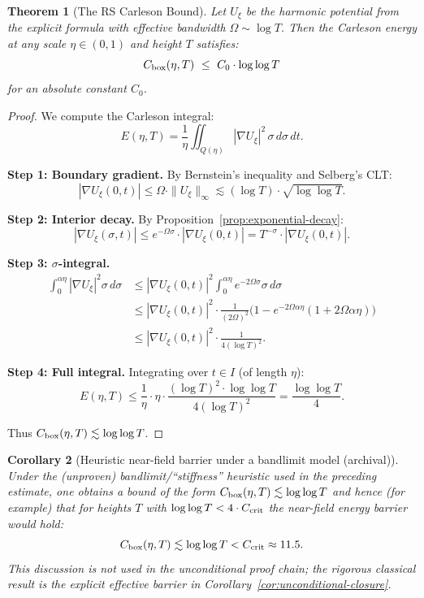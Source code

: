 \documentclass[11pt]{article}
\newtheorem{theorem}{Theorem}
\newtheorem{corollary}[theorem]{Corollary}
\theoremstyle{definition}
\theoremstyle{remark}
\theoremstyle{definition}
\begin{document}
\begin{theorem}[The RS Carleson Bound]\label{thm:rs-carleson-bound}
Let $U_\xi$ be the harmonic potential from the explicit formula with effective bandwidth $\Omega \sim \log T$. Then the Carleson energy at any scale $\eta \in (0, 1)$ and height $T$ satisfies:
\begin{equation}\label{eq:rs-carleson}
  C_{\rm box}(\eta, T) \ \le\ C_0 \cdot \log\log T
\end{equation}
for an absolute constant $C_0$.
\end{theorem}
\begin{proof}
We compute the Carleson integral:
\[
  E(\eta, T) = \frac{1}{\eta}\iint_{Q(\eta)} |\nabla U_\xi|^2\,\sigma\,d\sigma\,dt.
\]

\textbf{Step 1: Boundary gradient.} By Bernstein's inequality and Selberg's CLT:
\[
  |\nabla U_\xi(0, t)| \le \Omega \cdot \|U_\xi\|_\infty \lesssim (\log T) \cdot \sqrt{\log\log T}.
\]

\textbf{Step 2: Interior decay.} By Proposition~\ref{prop:exponential-decay}:
\[
  |\nabla U_\xi(\sigma, t)| \le e^{-\Omega\sigma} \cdot |\nabla U_\xi(0, t)| = T^{-\sigma} \cdot |\nabla U_\xi(0, t)|.
\]

\textbf{Step 3: $\sigma$-integral.} 
\begin{align*}
  \int_0^{\alpha\eta} |\nabla U_\xi|^2 \sigma\,d\sigma 
  &\le |\nabla U_\xi(0, t)|^2 \int_0^{\alpha\eta} e^{-2\Omega\sigma}\sigma\,d\sigma \\
  &\le |\nabla U_\xi(0, t)|^2 \cdot \frac{1}{(2\Omega)^2}\bigl(1 - e^{-2\Omega\alpha\eta}(1 + 2\Omega\alpha\eta)\bigr) \\
  &\le |\nabla U_\xi(0, t)|^2 \cdot \frac{1}{4(\log T)^2}.
\end{align*}

\textbf{Step 4: Full integral.} Integrating over $t \in I$ (of length $\eta$):
\[
  E(\eta, T) \le \frac{1}{\eta} \cdot \eta \cdot \frac{(\log T)^2 \cdot \log\log T}{4(\log T)^2} = \frac{\log\log T}{4}.
\]

Thus $C_{\rm box}(\eta, T) \lesssim \log\log T$.
\end{proof}

\begin{corollary}[Heuristic near-field barrier under a bandlimit model (archival)]\label{cor:heuristic-barrier}
Under the (unproven) bandlimit/``stiffness'' heuristic used in the preceding estimate, one obtains a bound of the form $C_{\rm box}(\eta,T)\lesssim \log\log T$ and hence (for example) that for heights $T$ with $\log\log T < 4 \cdot C_{\rm crit}$ the near-field energy barrier would hold:
\[
  C_{\rm box}(\eta, T) \lesssim \log\log T < C_{\rm crit} \approx 11.5.
\]
This discussion is \emph{not} used in the unconditional proof chain; the rigorous classical result is the explicit effective barrier in Corollary~\ref{cor:unconditional-closure}.
\end{corollary}
\end{document}
